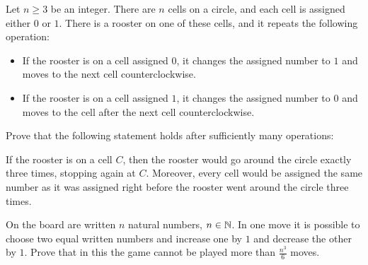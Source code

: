 \begin{problem}[APMO 2025]
    Let $n \geq 3$ be an integer. There are $n$ cells on a circle, and each cell is assigned either $0$ or $1$. There is a rooster on one of these cells, and it repeats the following operation:
    \begin{itemize}
        \item If the rooster is on a cell assigned $0$, it changes the assigned number to $1$ and moves to the next cell counterclockwise.
        \item If the rooster is on a cell assigned $1$, it changes the assigned number to $0$ and moves to the cell after the next cell counterclockwise.
    \end{itemize}
    Prove that the following statement holds after sufficiently many operations:

    If the rooster is on a cell $C$, then the rooster would go around the circle exactly three times, stopping again at $C$. Moreover, every cell would be assigned the same number as it was assigned right before the rooster went around the circle three times.
\end{problem}

\begin{problem} [Serbia 2022]
    On the board are written $n$ natural numbers, $n\in \mathbb N$. In one move it is possible to choose two equal written numbers and increase one by $1$ and decrease the other by $1$. Prove that in this the game cannot be played more than $\frac{n^3}{6}$ moves.
\end{problem}


